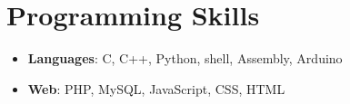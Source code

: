 \documentclass[letterpaper,11pt]{article}
\makeatletter
\newcommand{\resumeItem}[2]{
  \item\small{
    \textbf{#1}{: #2 \vspace{-2pt}}
  }
}
\newcommand{\resumeSubheading}[4]{
  \vspace{-1pt}\item
    \begin{tabular*}{0.97\textwidth}{l@{\extracolsep{\fill}}r}
      \textbf{#1} & #2 \\
      \textit{\small#3} & \textit{\small #4} \\
    \end{tabular*}\vspace{-5pt}
}
\newcommand{\resumeSubItem}[2]{\resumeItem{#1}{#2}\vspace{-4pt}}
\newcommand{\resumeSubHeadingListStart}{\begin{itemize}[leftmargin=*]}
\newcommand{\resumeSubHeadingListEnd}{\end{itemize}}
\newcommand{\resumeItemListStart}{\begin{itemize}}
\newcommand{\resumeItemListEnd}{\end{itemize}\vspace{-5pt}}
\makeatother
\begin{document}


   





\section{Programming Skills}
\resumeSubHeadingListStart
    \resumeSubItem{Languages}
      {C, C++, Python, shell, Assembly, Arduino}
    \resumeSubItem{Web}
      {PHP, MySQL, JavaScript, CSS, HTML}
  \resumeSubHeadingListEnd

\end{document}
